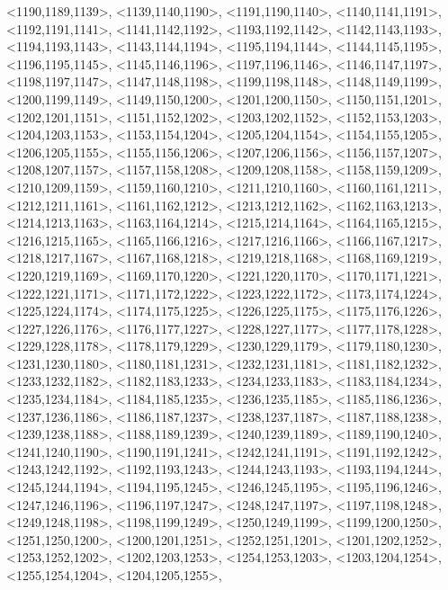 \documentclass[a4paper,10pt]{article}
\begin{document}
\begin{eulernotebook}
\begin{euleroutput}
  <1190,1189,1139>,
  <1139,1140,1190>,
  <1191,1190,1140>,
  <1140,1141,1191>,
  <1192,1191,1141>,
  <1141,1142,1192>,
  <1193,1192,1142>,
  <1142,1143,1193>,
  <1194,1193,1143>,
  <1143,1144,1194>,
  <1195,1194,1144>,
  <1144,1145,1195>,
  <1196,1195,1145>,
  <1145,1146,1196>,
  <1197,1196,1146>,
  <1146,1147,1197>,
  <1198,1197,1147>,
  <1147,1148,1198>,
  <1199,1198,1148>,
  <1148,1149,1199>,
  <1200,1199,1149>,
  <1149,1150,1200>,
  <1201,1200,1150>,
  <1150,1151,1201>,
  <1202,1201,1151>,
  <1151,1152,1202>,
  <1203,1202,1152>,
  <1152,1153,1203>,
  <1204,1203,1153>,
  <1153,1154,1204>,
  <1205,1204,1154>,
  <1154,1155,1205>,
  <1206,1205,1155>,
  <1155,1156,1206>,
  <1207,1206,1156>,
  <1156,1157,1207>,
  <1208,1207,1157>,
  <1157,1158,1208>,
  <1209,1208,1158>,
  <1158,1159,1209>,
  <1210,1209,1159>,
  <1159,1160,1210>,
  <1211,1210,1160>,
  <1160,1161,1211>,
  <1212,1211,1161>,
  <1161,1162,1212>,
  <1213,1212,1162>,
  <1162,1163,1213>,
  <1214,1213,1163>,
  <1163,1164,1214>,
  <1215,1214,1164>,
  <1164,1165,1215>,
  <1216,1215,1165>,
  <1165,1166,1216>,
  <1217,1216,1166>,
  <1166,1167,1217>,
  <1218,1217,1167>,
  <1167,1168,1218>,
  <1219,1218,1168>,
  <1168,1169,1219>,
  <1220,1219,1169>,
  <1169,1170,1220>,
  <1221,1220,1170>,
  <1170,1171,1221>,
  <1222,1221,1171>,
  <1171,1172,1222>,
  <1223,1222,1172>,
  <1173,1174,1224>,
  <1225,1224,1174>,
  <1174,1175,1225>,
  <1226,1225,1175>,
  <1175,1176,1226>,
  <1227,1226,1176>,
  <1176,1177,1227>,
  <1228,1227,1177>,
  <1177,1178,1228>,
  <1229,1228,1178>,
  <1178,1179,1229>,
  <1230,1229,1179>,
  <1179,1180,1230>,
  <1231,1230,1180>,
  <1180,1181,1231>,
  <1232,1231,1181>,
  <1181,1182,1232>,
  <1233,1232,1182>,
  <1182,1183,1233>,
  <1234,1233,1183>,
  <1183,1184,1234>,
  <1235,1234,1184>,
  <1184,1185,1235>,
  <1236,1235,1185>,
  <1185,1186,1236>,
  <1237,1236,1186>,
  <1186,1187,1237>,
  <1238,1237,1187>,
  <1187,1188,1238>,
  <1239,1238,1188>,
  <1188,1189,1239>,
  <1240,1239,1189>,
  <1189,1190,1240>,
  <1241,1240,1190>,
  <1190,1191,1241>,
  <1242,1241,1191>,
  <1191,1192,1242>,
  <1243,1242,1192>,
  <1192,1193,1243>,
  <1244,1243,1193>,
  <1193,1194,1244>,
  <1245,1244,1194>,
  <1194,1195,1245>,
  <1246,1245,1195>,
  <1195,1196,1246>,
  <1247,1246,1196>,
  <1196,1197,1247>,
  <1248,1247,1197>,
  <1197,1198,1248>,
  <1249,1248,1198>,
  <1198,1199,1249>,
  <1250,1249,1199>,
  <1199,1200,1250>,
  <1251,1250,1200>,
  <1200,1201,1251>,
  <1252,1251,1201>,
  <1201,1202,1252>,
  <1253,1252,1202>,
  <1202,1203,1253>,
  <1254,1253,1203>,
  <1203,1204,1254>,
  <1255,1254,1204>,
  <1204,1205,1255>,

\end{euleroutput}
\end{eulernotebook}
\end{document}
